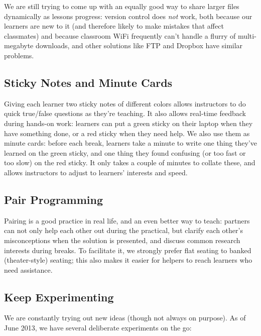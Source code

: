 \documentclass{article}
\begin{document}
We are still trying to come up with an equally good way to share larger
files dynamically as lessons progress: version control does \emph{not}
work, both because our learners are new to it (and therefore likely to
make mistakes that affect classmates) and because classroom WiFi
frequently can't handle a flurry of multi-megabyte downloads, and other
solutions like FTP and Dropbox have similar problems.

\subsection{Sticky Notes and Minute Cards}

Giving each learner two sticky notes of different colors allows
instructors to do quick true/false questions as they're teaching. It
also allows real-time feedback during hands-on work: learners can put a
green sticky on their laptop when they have something done, or a red
sticky when they need help. We also use them as minute cards: before
each break, learners take a minute to write one thing they've learned on
the green sticky, and one thing they found confusing (or too fast or too
slow) on the red sticky. It only takes a couple of minutes to collate
these, and allows instructors to adjust to learners' interests and
speed.

\subsection{Pair Programming}

Pairing is a good practice in real life, and an even better way to
teach: partners can not only help each other out during the practical,
but clarify each other's misconceptions when the solution is presented,
and discuss common research interests during breaks. To facilitate it,
we strongly prefer flat seating to banked (theater-style) seating; this
also makes it easier for helpers to reach learners who need assistance.

\subsection{Keep Experimenting}

We are constantly trying out new ideas (though not always on purpose).
As of June 2013, we have several deliberate experiments on the go:
\end{document}
